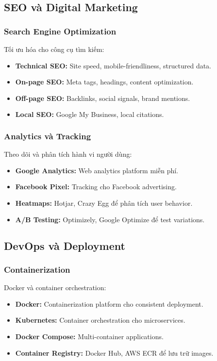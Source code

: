 \documentclass[a4paper,12pt]{report}
\begin{document}
\subsection{SEO và Digital Marketing}

\subsubsection{Search Engine Optimization}
Tối ưu hóa cho công cụ tìm kiếm:
\begin{itemize}
    \item \textbf{Technical SEO:} Site speed, mobile-friendliness, structured data.
    \item \textbf{On-page SEO:} Meta tags, headings, content optimization.
    \item \textbf{Off-page SEO:} Backlinks, social signals, brand mentions.
    \item \textbf{Local SEO:} Google My Business, local citations.
\end{itemize}

\subsubsection{Analytics và Tracking}
Theo dõi và phân tích hành vi người dùng:
\begin{itemize}
    \item \textbf{Google Analytics:} Web analytics platform miễn phí.
    \item \textbf{Facebook Pixel:} Tracking cho Facebook advertising.
    \item \textbf{Heatmaps:} Hotjar, Crazy Egg để phân tích user behavior.
    \item \textbf{A/B Testing:} Optimizely, Google Optimize để test variations.
\end{itemize}

\subsection{DevOps và Deployment}

\subsubsection{Containerization}
Docker và container orchestration:
\begin{itemize}
    \item \textbf{Docker:} Containerization platform cho consistent deployment.
    \item \textbf{Kubernetes:} Container orchestration cho microservices.
    \item \textbf{Docker Compose:} Multi-container applications.
    \item \textbf{Container Registry:} Docker Hub, AWS ECR để lưu trữ images.
\end{itemize}
\end{document}
